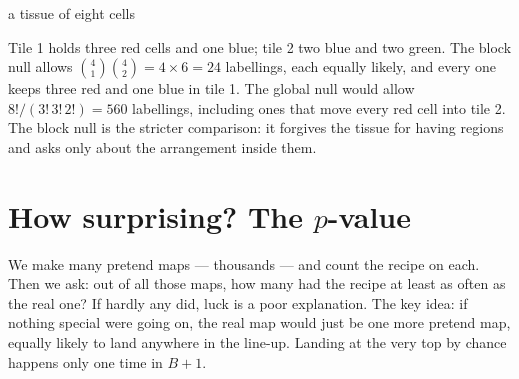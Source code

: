 \documentclass[11pt,a4paper]{article}
\theoremstyle{remark}
\begin{document}
\begin{example}{a tissue of eight cells}
\begin{center}
\end{center}
Tile 1 holds three red cells and one blue; tile 2 two blue and two green. The
block null allows $\binom41\binom42=4\times6=24$ labellings, each equally
likely, and every one keeps three red and one blue in tile 1. The global null
would allow $8!/(3!\,3!\,2!)=560$ labellings, including ones that move every
red cell into tile 2. The block null is the stricter comparison: it forgives
the tissue for having regions and asks only about the arrangement inside them.
\end{example}

\section{How surprising? The \texorpdfstring{$p$}{p}-value}
\label{sec:p}

\begin{plain}
We make many pretend maps --- thousands --- and count the recipe on each. Then
we ask: out of all those maps, how many had the recipe at least as often as the
real one? If hardly any did, luck is a poor explanation. The key idea: if
nothing special were going on, the real map would just be one more pretend map,
equally likely to land anywhere in the line-up. Landing at the very top by
chance happens only one time in $B+1$.
\end{plain}
\end{document}

